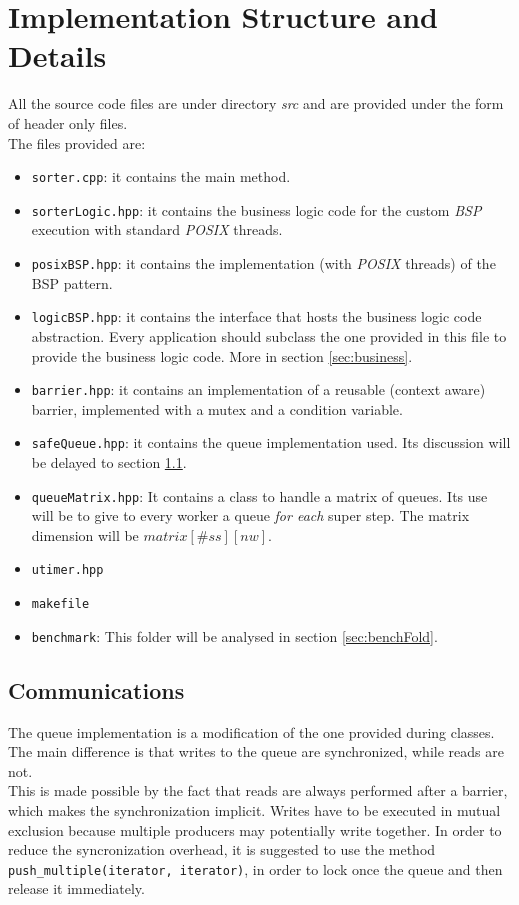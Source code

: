 \documentclass[]{article}
\def\code#1{\texttt{#1}}
\begin{document}
\section{Implementation Structure and Details}
\label{sec:implDetails}

All the source code files are under directory \emph{src} and are provided under the form of header only files. \\The files provided are:
\begin{itemize}
	\item \code{sorter.cpp}: it contains the main method. 
	\item \code{sorterLogic.hpp}: it contains the business logic code for the custom \emph{BSP} execution with standard \emph{POSIX} threads.
	\item \code{posixBSP.hpp}: it contains the implementation (with \emph{POSIX} threads) of the BSP pattern.
	\item \code{logicBSP.hpp}: it contains the interface that hosts the business logic code abstraction. Every application should subclass the one provided in this file to provide the business logic code. More in section \ref{sec:business}.
	\item \code{barrier.hpp}: it contains an implementation of a reusable (context aware) barrier, implemented with a mutex and a condition variable.
	\item \code{safeQueue.hpp}: it contains the queue implementation used. Its discussion will be delayed to section \ref{sec:queue}.
	\item \code{queueMatrix.hpp}: It contains a class to handle a matrix of queues. Its use will be to give to every worker a queue \emph{for each} super step. The matrix dimension will be $matrix[\#\mathit{ss}][\mathit{nw}]$.
	\item \code{utimer.hpp}
	\item \code{makefile}
	\item \code{benchmark}: This folder will be analysed in section \ref{sec:benchFold}.
\end{itemize}

\subsection{Communications}
\label{sec:queue}
The queue implementation is a modification of the one provided during classes. The main difference is that writes to the queue are synchronized, while reads are not. \\ This is made possible by the fact that reads are always performed after a barrier, which makes the synchronization implicit. Writes have to be executed in mutual exclusion because multiple producers may potentially write together. In order to reduce the syncronization overhead, it is suggested to use the method \code{push\_multiple(iterator, iterator)}, in order to lock once the queue and then release it immediately.
\end{document}
